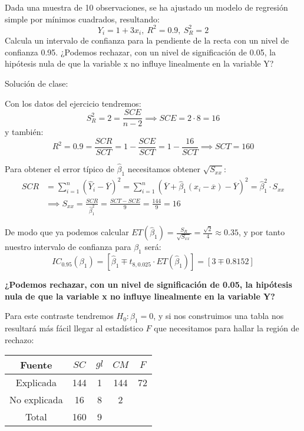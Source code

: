 \begin{problem}[2]
Dada una muestra de 10 observaciones, se ha ajustado un modelo de regresión simple por mínimos cuadrados, resultando:
  \[Y_i =1+3x_i,\ R^2 =0.9,\ S_R^2 =2\]
Calcula un intervalo de confianza para la pendiente de la recta con un nivel de confianza 0.95. ¿Podemos rechazar, con un nivel de significación de 0.05, la hipótesis nula de que la variable x no influye linealmente en la variable Y?

\solution 

{\color{blue} Solución de clase:}

Con los datos del ejercicio tendremos:
\[S_R^2 = 2 = \frac{SCE}{n-2} \implies SCE = 2·8 = 16\]
y también:
\[R^2=0.9=\frac{SCR}{SCT} = 1 - \frac{SCE}{SCT} = 1 - \frac{16}{SCT} \implies SCT = 160
\]

Para obtener el error típico de $\hat{β}_1$ necesitamos obtener $\sqrt{S_{xx}}$:
\begin{align*}
	SCR &= \sum_{i=1}^n (\hat{Y}_i - \overline{Y})^2 = \sum_{i=1}^n (\overline{Y} + \hat{β}_1(x_i - \overline{x}) - \overline{Y})^2 = \hat{β}_1^2·S_{xx} \\
	&\implies S_{xx}=\frac{SCR}{\hat{β}_1^2} = \frac{SCT - SCE}{9} = \frac{144}{9} = 16
\end{align*}

De modo que ya podemos calcular $ET(\hat{β}_1) = \frac{S_R}{\sqrt{S_{xx}}} = \frac{\sqrt{2}}{4} ≈ 0.35$, y por tanto nuestro intervalo de confianza para $β_1$ será:
\[IC_{0.95}(β_1) = \left[ \hat{β}_1 \mp t_{8,0.025} · ET(\hat{β}_1) \right] = \left[ 3 \mp 0.8152 \right]\]

\textbf{¿Podemos rechazar, con un nivel de significación de 0.05, la hipótesis nula de que la variable x no influye linealmente en la variable Y?}

Para este contraste tendremos $H_0: β_1=0$, y si nos construimos una tabla nos resultará más fácil llegar al estadístico $F$ que necesitamos para hallar la región de rechazo:

\begin{center}
	\begin{tabular}{ c c c c c }
	  Fuente & $SC$ & $gl$ & $CM$ & $F$ \\ \hline
	  Explicada & 144 & 1 & 144 & 72 \\
	  No explicada & 16 & 8 & 2 \\ \hline
	  Total & 160 & 9
	\end{tabular}
\end{center}


\end{problem}

